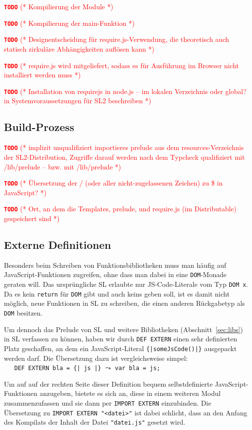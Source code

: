 \documentclass[runningheads]{llncs}
\newcommand{\TODO}[1]{ \textcolor{red}{\textbf{\texttt{\large{TODO}}} (* #1 *)}\par}
\begin{document}
\TODO{Kompilierung der Module}

\TODO{Kompilierung der main-Funktion}

\TODO{Designentscheidung für require.js-Verwendung, die theoretisch
auch statisch zirkuläre Abhängigkeiten auflösen kann}
\TODO{require.js wird mitgeliefert, sodass es für Ausführung im
Browser nicht installiert werden muss}
\TODO{Installation von requirejs in node.js -- im lokalen Verzeichnis
oder global? in Systemvoraussetzungen für SL2 beschreiben}

\subsection{Build-Prozess}
\label{sec:compBuild}

\TODO{implizit unqualifiziert importieres prelude aus dem
resources-Verzeichnis der SL2-Distribution, Zugriffe darauf werden
nach dem Typcheck qualifiziert mit /lib/prelude -- bzw. mit /lib/prelude}

\TODO{Übersetzung der / (oder aller nicht-zugelassenen Zeichen) zu \$
in JavaScript?}

\TODO{Ort, an dem die Templates, prelude, und require.js (im Distributable)
gespeichert sind}

\subsection{Externe Definitionen}
Besonders beim Schreiben von Funktionsbibliotheken muss man häufig auf
Java\-Script-Funktionen zugreifen, ohne dass man dabei in eine
\verb|DOM|-Monade geraten will. Das ursprüngliche SL erlaubte nur
JS-Code-Literale vom Typ \verb|DOM x|. Da es kein \verb|return| für
\verb|DOM| gibt und auch keins geben soll, ist es damit nicht möglich,
neue Funktionen in SL zu schreiben, die einen anderen Rückgabetyp als
\verb|DOM| besitzen.

Um dennoch das Prelude von SL und weitere Bibliotheken (Abschnitt~\ref{sec:libs})
in SL verfassen zu können, haben wir durch \verb|DEF EXTERN| einen sehr
definierten Platz geschaffen, an dem ein Java\-Script-Literal
\verb.{|someJsCode()|}. ausgepackt werden darf. Die Übersetzung dazu ist
vergleichsweise simpel:\\
\verb.   DEF EXTERN bla = {| js |}.
\quad $\leadsto$ \quad \verb|var bla = js;|

Um auf auf der rechten Seite dieser Definition bequem selbstdefinierte
Java\-Script-Funktionen anzugeben, bietete es sich an, diese in einem
weiteren Modul zusammenzufassen und sie dann per \verb|IMPORT EXTERN|
einzubinden. Die Übersetzung zu \verb|IMPORT EXTERN "<datei>"| ist dabei
schlicht, dass an den Anfang des Kompilats der Inhalt der Datei
\verb|"datei.js"| gesetzt wird.
\end{document}
